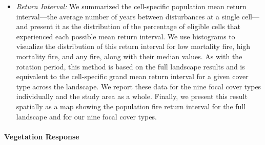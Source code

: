 \begin{itemize}
	\item \emph{Return Interval:} We summarized the cell-specific population mean return interval---the average number of years between disturbances at a single cell---and present it as the distribution of the percentage of eligible cells that experienced each possible mean return interval. We use histograms to visualize the distribution of this return interval for low mortality fire, high mortality fire, and any fire, along with their median values. As with the rotation period, this method is based on the full landscape results and is equivalent to the cell-specific grand mean return interval for a given cover type across the landscape. We report these data for the nine focal cover types individually and the study area as a whole. Finally, we present this result spatially as a map showing the population fire return interval for the full landscape and for our nine focal cover types.
\end{itemize}

\paragraph{Vegetation Response} 

